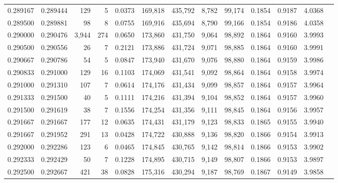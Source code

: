 \begin{tabular}{rrrrrrrrrrrrr}
0.289167 & 0.289444 &   129 &   5 &                                     0.0373 & 169,818 & 435,792 &   8,782 &  99,174 & 0.1854 & 0.9187 & 4.0368 \\
0.289500 & 0.289881 &    98 &   8 &                                     0.0755 & 169,916 & 435,694 &   8,790 &  99,166 & 0.1854 & 0.9186 & 4.0358 \\
0.290000 & 0.290476 & 3,944 & 274 &                                     0.0650 & 173,860 & 431,750 &   9,064 &  98,892 & 0.1864 & 0.9160 & 3.9993 \\
0.290500 & 0.290556 &    26 &   7 &                                     0.2121 & 173,886 & 431,724 &   9,071 &  98,885 & 0.1864 & 0.9160 & 3.9991 \\
0.290667 & 0.290786 &    54 &   5 &                                     0.0847 & 173,940 & 431,670 &   9,076 &  98,880 & 0.1864 & 0.9159 & 3.9986 \\
0.290833 & 0.291000 &   129 &  16 &                                     0.1103 & 174,069 & 431,541 &   9,092 &  98,864 & 0.1864 & 0.9158 & 3.9974 \\
0.291000 & 0.291310 &   107 &   7 &                                     0.0614 & 174,176 & 431,434 &   9,099 &  98,857 & 0.1864 & 0.9157 & 3.9964 \\
0.291333 & 0.291500 &    40 &   5 &                                     0.1111 & 174,216 & 431,394 &   9,104 &  98,852 & 0.1864 & 0.9157 & 3.9960 \\
0.291500 & 0.291619 &    38 &   7 &                                     0.1556 & 174,254 & 431,356 &   9,111 &  98,845 & 0.1864 & 0.9156 & 3.9957 \\
0.291667 & 0.291667 &   177 &  12 &                                     0.0635 & 174,431 & 431,179 &   9,123 &  98,833 & 0.1865 & 0.9155 & 3.9940 \\
0.291667 & 0.291952 &   291 &  13 &                                     0.0428 & 174,722 & 430,888 &   9,136 &  98,820 & 0.1866 & 0.9154 & 3.9913 \\
0.292000 & 0.292286 &   123 &   6 &                                     0.0465 & 174,845 & 430,765 &   9,142 &  98,814 & 0.1866 & 0.9153 & 3.9902 \\
0.292333 & 0.292429 &    50 &   7 &                                     0.1228 & 174,895 & 430,715 &   9,149 &  98,807 & 0.1866 & 0.9153 & 3.9897 \\
0.292500 & 0.292667 &   421 &  38 &                                     0.0828 & 175,316 & 430,294 &   9,187 &  98,769 & 0.1867 & 0.9149 & 3.9858 \\

\end{tabular}
